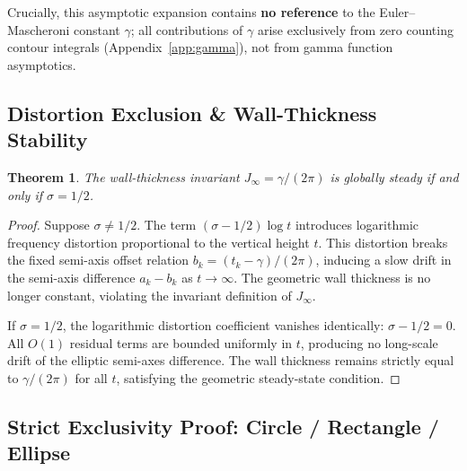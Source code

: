 \documentclass[10pt,reqno]{article}
\newcommand{\gammaconst}{\gamma}
\newcommand{\Jinf}{J_\infty}
\newcommand{\azero}{a_k}
\newcommand{\bzero}{b_k}
\newtheorem{thm}{Theorem}[section]
\begin{document}
Crucially, this asymptotic expansion contains \textbf{no reference} to the Euler--Mascheroni constant $\gammaconst$; all contributions of $\gammaconst$ arise exclusively from zero counting contour integrals (Appendix~\ref{app:gamma}), not from gamma function asymptotics.

\subsection{Distortion Exclusion \& Wall-Thickness Stability}
\label{subsec:distortion}

\begin{thm}\label{thm:wall-thickness}
The wall-thickness invariant $\Jinf=\gammaconst/(2\pi)$ is globally steady if and only if $\sigma=1/2$.
\end{thm}
\begin{proof}
Suppose $\sigma\neq 1/2$. The term $(\sigma-1/2)\log t$ introduces logarithmic frequency distortion proportional to the vertical height $t$. This distortion breaks the fixed semi-axis offset relation $\bzero=(t_k-\gammaconst)/(2\pi)$, inducing a slow drift in the semi-axis difference $\azero-\bzero$ as $t\to\infty$. The geometric wall thickness is no longer constant, violating the invariant definition of $\Jinf$.

If $\sigma=1/2$, the logarithmic distortion coefficient vanishes identically: $\sigma-1/2=0$. All $O(1)$ residual terms are bounded uniformly in $t$, producing no long-scale drift of the elliptic semi-axes difference. The wall thickness remains strictly equal to $\gammaconst/(2\pi)$ for all $t$, satisfying the geometric steady-state condition.
\end{proof}

\subsection{Strict Exclusivity Proof: Circle / Rectangle / Ellipse}
\label{subsec:exclusivity}
\end{document}
